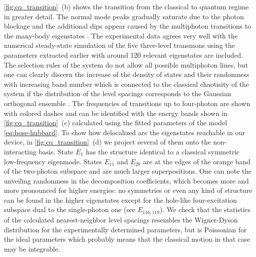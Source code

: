 \documentclass[%
 aps, pra,
 amsmath,amssymb,
 reprint,%
superscriptaddress
]{revtex4-2}
\begin{document}
\autoref{fig:cq_transition}~(b) shows the transition from the classical to quantum regime in greater detail. The normal mode peaks gradually saturate due to the photon blockage and the additional dips appear caused by the multiphoton transitions to the many-body eigenstates \cite{Biella2015,PhysRevA.102.013707,roberts2020driven}. The experimental data agrees very well with the numerical steady-state simulation of the five three-level transmons using the parameters extracted earlier with around 120 relevant eigenstates are included. The selection rules of the system do not allow all possible multiphoton lines, but one can clearly discern the increase of the density of states and their randomness with increasing band number which is connected to the classical chaotisity of the system if the distribution of the level spacings corresponds to the Gaussian orthogonal ensemble \cite{bohigas1984characterization,zimmermann1986manifestation, livan2018introduction}. The frequencies of transitions up to four-photon are shown with colored dashes and can be identified with the energy bands shown in \autoref{fig:cq_transition}~(c) calculated using the fitted parameters of the model \eqref{eq:bose-hubbard}. To show how delocalized are the eigenstates reachable in our device, in \autoref{fig:cq_transition}~(d) we project several of them onto the non-interacting basis. State $E_1$ has the structure identical to a classical symmetric low-frequency eigenmode. States $E_{11}$ and $E_{20}$ are at the edges of the orange band of the two-photon subspace and are much larger superpositions. One can note the unveiling randomness in the decomposition coefficients, which becomes more and more pronounced for higher energies: no symmetries or even any kind of structure can be found in the higher eigenstates except for the hole-like four-excitation subspace dual to the single-photon one (see $E_{116, 119}$). We check that the statistics of the calculated nearest-neighbor level spacings resembles the Wigner-Dyson distribution for the experimentally determined parameters, but is Poissonian for the ideal parameters which probably means that the classical motion in that case may be integrable.
\end{document}
